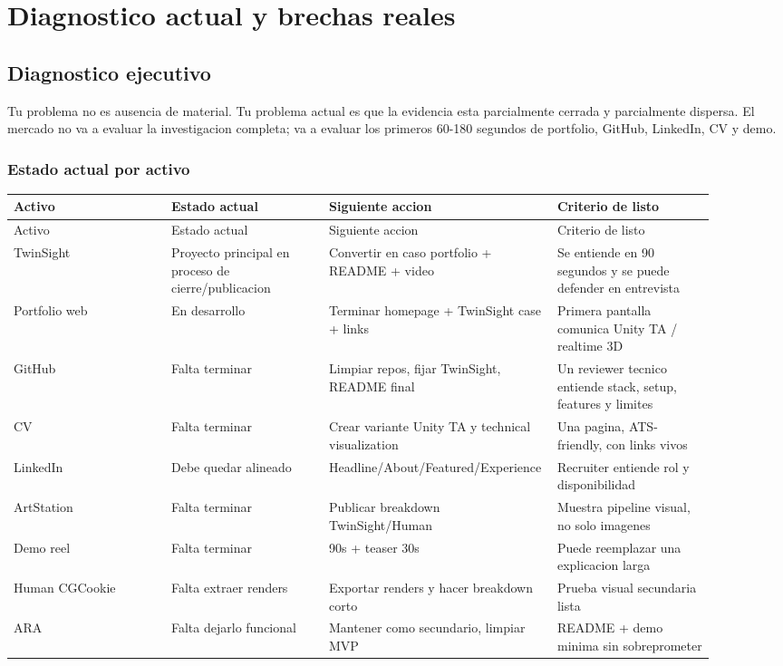 \chapter{Diagnostico actual y brechas reales}

\section{Diagnostico ejecutivo}


Tu problema no es ausencia de material. Tu problema actual es que la evidencia esta parcialmente cerrada y parcialmente dispersa. El mercado no va a evaluar la investigacion completa; va a evaluar los primeros 60-180 segundos de portfolio, GitHub, LinkedIn, CV y demo.


\subsection{Estado actual por activo}


\begin{center}
\scriptsize
\begin{longtable}{>{\raggedright\arraybackslash}p{0.225\linewidth} >{\raggedright\arraybackslash}p{0.225\linewidth} >{\raggedright\arraybackslash}p{0.225\linewidth} >{\raggedright\arraybackslash}p{0.225\linewidth}}
\toprule
Activo & Estado actual & Siguiente accion & Criterio de listo \\
\midrule
\endfirsthead
\toprule
Activo & Estado actual & Siguiente accion & Criterio de listo \\
\midrule
\endhead
TwinSight & Proyecto principal en proceso de cierre/publicacion & Convertir en caso portfolio + README + video & Se entiende en 90 segundos y se puede defender en entrevista \\
Portfolio web & En desarrollo & Terminar homepage + TwinSight case + links & Primera pantalla comunica Unity TA / realtime 3D \\
GitHub & Falta terminar & Limpiar repos, fijar TwinSight, README final & Un reviewer tecnico entiende stack, setup, features y limites \\
CV & Falta terminar & Crear variante Unity TA y technical visualization & Una pagina, ATS-friendly, con links vivos \\
LinkedIn & Debe quedar alineado & Headline/About/Featured/Experience & Recruiter entiende rol y disponibilidad \\
ArtStation & Falta terminar & Publicar breakdown TwinSight/Human & Muestra pipeline visual, no solo imagenes \\
Demo reel & Falta terminar & 90s + teaser 30s & Puede reemplazar una explicacion larga \\
Human CGCookie & Falta extraer renders & Exportar renders y hacer breakdown corto & Prueba visual secundaria lista \\
ARA & Falta dejarlo funcional & Mantener como secundario, limpiar MVP & README + demo minima sin sobreprometer \\
\bottomrule
\end{longtable}
\end{center}



